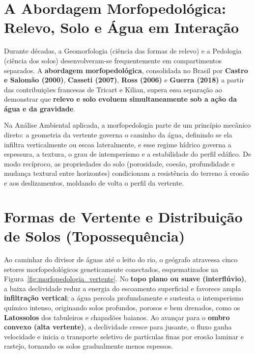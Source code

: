 \section{A Abordagem Morfopedológica: Relevo, Solo e Água em Interação}

Durante décadas, a Geomorfologia (ciência das formas de relevo) e a Pedologia (ciência dos solos) desenvolveram-se frequentemente em compartimentos separados. A \textbf{abordagem morfopedológica}, consolidada no Brasil por \textbf{Castro e Salomão (2000)}, \textbf{Casseti (2007)}, \textbf{Ross (2006)} e \textbf{Guerra (2018)} a partir das contribuições francesas de Tricart e Kilian, supera essa separação ao demonstrar que \textbf{relevo e solo evoluem simultaneamente sob a ação da água e da gravidade}.

Na Análise Ambiental aplicada, a morfopedologia parte de um princípio mecânico direto: a geometria da vertente governa o caminho da água, definindo se ela infiltra verticalmente ou escoa lateralmente, e esse regime hídrico governa a espessura, a textura, o grau de intemperismo e a estabilidade do perfil edáfico. De modo recíproco, as propriedades do solo (porosidade, coesão, profundidade e mudança textural entre horizontes) condicionam a resistência do terreno à erosão e aos deslizamentos, moldando de volta o perfil da vertente.

\section{Formas de Vertente e Distribuição de Solos (Topossequência)}

Ao caminhar do divisor de águas até o leito do rio, o geógrafo atravessa cinco setores morfopedológicos geneticamente conectados, esquematizados na Figura~\ref{fig:morfopedologia_vertente}. No \textbf{topo plano ou suave (interflúvio)}, a baixa declividade reduz a energia do escoamento superficial e favorece ampla \textbf{infiltração vertical}; a água percola profundamente e sustenta o intemperismo químico intenso, originando solos profundos, porosos e bem drenados, como os \textbf{Latossolos} dos tabuleiros e chapadões baianos. Ao avançar para o \textbf{ombro convexo (alta vertente)}, a declividade cresce para jusante, o fluxo ganha velocidade e inicia o transporte seletivo de partículas finas por erosão laminar e rastejo, tornando os solos gradualmente menos espessos.

